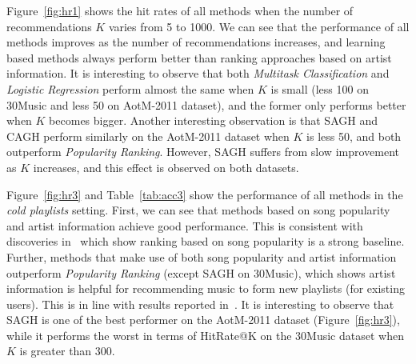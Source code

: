 Figure~\ref{fig:hr1} shows the hit rates of all methods when the number of recommendations $K$ varies from 5 to 1000.
We can see that the performance of all methods improves as the number of recommendations increases,
and learning based methods always perform better than ranking approaches based on artist information.
It is interesting to observe that both {\it Multitask Classification} and {\it Logistic Regression} perform 
almost the same when $K$ is small (less 100 on 30Music and less 50 on AotM-2011 dataset), 
and the former only performs better when $K$ becomes bigger.
Another interesting observation is that SAGH and CAGH perform similarly on the AotM-2011 dataset when $K$
is less 50, and both outperform {\it Popularity Ranking}. However, SAGH suffers from slow improvement
as $K$ increases, and this effect is observed on both datasets.

Figure~\ref{fig:hr3} and Table~\ref{tab:acc3} show the performance of all methods in the \emph{cold playlists} setting.
First, we can see that methods based on song popularity and artist information achieve good performance.
This is consistent with discoveries in~\cite{bonnin2013evaluating,jannach2015beyond,bonnin2015automated} which 
show ranking based on song popularity is a strong baseline.
Further, methods that make use of both song popularity and artist information
outperform {\it Popularity Ranking} (except SAGH on 30Music), which shows artist information is helpful for 
recommending music to form new playlists (for existing users).
This is in line with results reported in~\cite{bonnin2013evaluating,bonnin2015automated}.
%
It is interesting to observe that SAGH is one of the best performer on the AotM-2011 dataset (Figure~\ref{fig:hr3}), 
while it performs the worst in terms of HitRate@K on the 30Music dataset when $K$ is greater than 300.
%


